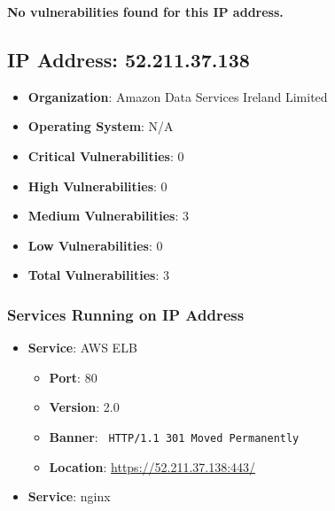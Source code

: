 \documentclass{article}
\begin{document}
\textbf{No vulnerabilities found for this IP address.}


\clearpage



\subsection*{IP Address: 52.211.37.138}

\begin{itemize}
    \item \textbf{Organization}: Amazon Data Services Ireland Limited
    \item \textbf{Operating System}:  N/A 
    \item \textbf{Critical Vulnerabilities}: 0
    \item \textbf{High Vulnerabilities}: 0
    \item \textbf{Medium Vulnerabilities}: 3
    \item \textbf{Low Vulnerabilities}: 0
    \item \textbf{Total Vulnerabilities}: 3
\end{itemize}

\subsubsection*{Services Running on IP Address}

\begin{itemize}
    
        \item \textbf{Service}: AWS ELB
        \begin{itemize}
            \item \textbf{Port}: 80
            \item \textbf{Version}:  2.0 
            \item \textbf{Banner}: \texttt{ HTTP/1.1 301 Moved Permanently
 }
            \item \textbf{Location}: \href{ https://52.211.37.138:443/ }{ https://52.211.37.138:443/ }
        \end{itemize}
    
        \item \textbf{Service}: nginx
    
\end{itemize}
\end{document}
